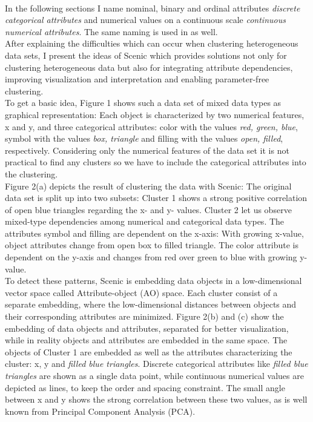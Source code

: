 \documentclass[conference]{IEEEtran}
\begin{document}
\\
In the following sections I name nominal, binary and ordinal attributes \textit{discrete categorical attributes} and numerical values on a continuous scale \textit{continuous numerical attributes}. The same naming is used in \cite{scenic} as well.
\\
After explaining the difficulties which can occur when clustering heterogeneous data sets, I present the ideas of Scenic which provides solutions not only for clustering heterogeneous data but also for integrating attribute dependencies, improving visualization and interpretation and enabling parameter-free clustering.
\\
To get a basic idea, Figure 1 \cite{scenic} shows such a data set of mixed data types as graphical representation: Each object is characterized by two numerical features, x and y, and three categorical attributes: color with the values \textit{red, green, blue}, symbol with the values \textit{box, triangle} and filling with the values \textit{open, filled}, respectively. Considering only the numerical features of the data set it is not practical to find any clusters so we have to include the categorical attributes into the clustering.
\\
Figure 2(a) \cite{scenic} depicts the result of clustering the data with Scenic: The original data set is split up into two subsets: Cluster 1 shows a strong positive correlation of open blue triangles regarding the x- and y- values. Cluster 2 let us observe mixed-type dependencies among numerical and categorical data types. The attributes symbol and filling are dependent on the x-axis: With growing x-value, object attributes change from open box to filled triangle. The color attribute is dependent on the y-axis and changes from red over green to blue with growing y-value.
\\
To detect these patterns, Scenic is embedding data objects in a low-dimensional vector space called Attribute-object (AO) space. Each cluster consist of a separate embedding, where the low-dimensional distances between objects and their corresponding attributes are minimized. Figure 2(b) and (c) \cite{scenic} show the embedding of data objects and attributes, separated for better visualization, while in reality objects and attributes are embedded in the same space.
The objects of Cluster 1 are embedded as well as the attributes characterizing the cluster: x, y and \textit{filled blue triangles}. Discrete categorical attributes like \textit{filled blue triangles} are shown as a single data point, while continuous numerical values are depicted as lines, to keep the order and spacing constraint. The small angle between x and y shows the strong correlation between these two values, as is well known from Principal Component Analysis (PCA).
\end{document}
